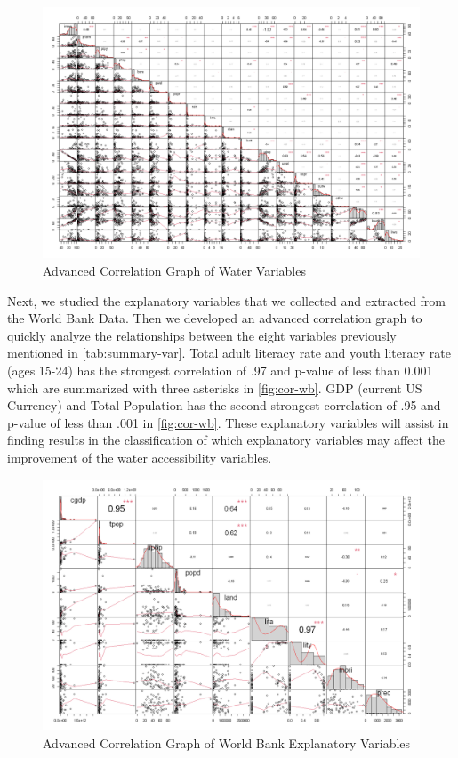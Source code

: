 \documentclass[10pt,twoside]{article}
\numberwithin{equation}{section}
\newcommand{\?}{\stackrel{?}{=}}
\begin{document}
\begin{figure}[h!]
  \centering
  \includegraphics[width=.7\textwidth]{adv-cor-plot}
  \caption{Advanced Correlation Graph of Water Variables}
  \label{fig:cor-plot}
\end{figure}
Next, we studied the explanatory variables that we collected and extracted from the World Bank Data. Then we developed an advanced correlation graph to quickly analyze the relationships between the eight variables previously mentioned in \autoref{tab:summary-var}. Total adult literacy rate and youth literacy rate (ages 15-24) has the strongest correlation of .97 and p-value of less than 0.001 which are summarized with three asterisks in \autoref{fig:cor-wb}. GDP (current US Currency) and Total Population has the second strongest correlation of .95 and p-value of less than .001 in \autoref{fig:cor-wb}. These explanatory variables will assist in finding results in the classification of which explanatory variables may affect the improvement of the water accessibility variables. 

\begin{figure}[h!]
  \centering
  \includegraphics[width=.7\textwidth]{cor-wb}
  \caption{Advanced Correlation Graph of World Bank Explanatory Variables}
  \label{fig:cor-wb}
\end{figure}
\end{document}
